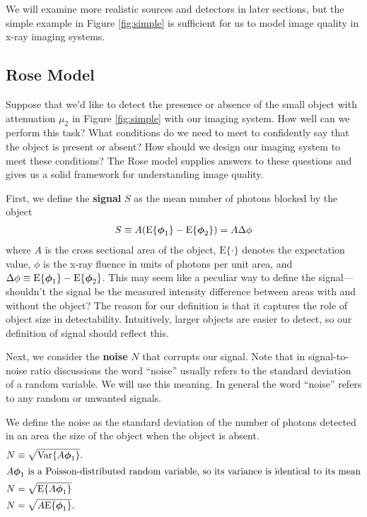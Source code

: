 \documentclass[mphy386-notes.tex]{subfiles}
\begin{document}
We will examine more realistic sources and detectors in later sections, but the
simple example in Figure \ref{fig:simple} is sufficient for us to model image
quality in x-ray imaging systems. 

\subsection{Rose Model}
Suppose that we'd like to detect the presence or absence of the small object
with attenuation $\mu_2$ in Figure \ref{fig:simple} with our imaging system. How
well can we perform this task? What conditions do we need to meet to confidently
say that the object is present or absent? How should we design our imaging
system to meet these conditions? The Rose model supplies answers to these
questions and gives us a solid framework for understanding image quality.

First, we define the \textbf{signal} $S$ as the mean number of photons
blocked by the object
\begin{align}
  S \equiv A(\text{E}\{\boldsymbol{\phi}_1\} - \text{E}\{\boldsymbol{\phi}_2\}) = A\Delta\phi
\end{align}
where $A$ is the cross sectional area of the object, $\text{E}\{\cdot\}$ denotes
the expectation value, $\phi$ is the x-ray fluence in units of photons per unit
area, and $\Delta\phi \equiv \text{E}\{\boldsymbol{\phi}_1\} -
\text{E}\{\boldsymbol{\phi}_2\}$. This may seem like a peculiar way to define the
signal---shouldn't the signal be the measured intensity difference between areas
with and without the object? The reason for our definition is that it captures
the role of object size in detectability. Intuitively, larger objects are easier
to detect, so our definition of signal should reflect this.

Next, we consider the \textbf{noise} $N$ that corrupts our signal. Note that in
signal-to-noise ratio discussions the word ``noise'' usually refers to the
standard deviation of a random variable. We will use this meaning. In general
the word ``noise'' refers to any random or unwanted signals.

We define the noise as the standard deviation of the number of photons detected
in an area the size of the object when the object is absent. 
\begin{align}
  N &\equiv \sqrt{\text{Var}\{A\boldsymbol{\phi}_1\}}.\\
  \intertext{$A\boldsymbol{\phi}_1$ is a Poisson-distributed random variable, so its variance is identical to its mean}
  N &= \sqrt{\text{E}\{A\boldsymbol{\phi}_1\}}\\
  N &= \sqrt{A\text{E}\{\boldsymbol{\phi}_1\}}.
\end{align}
\end{document}
